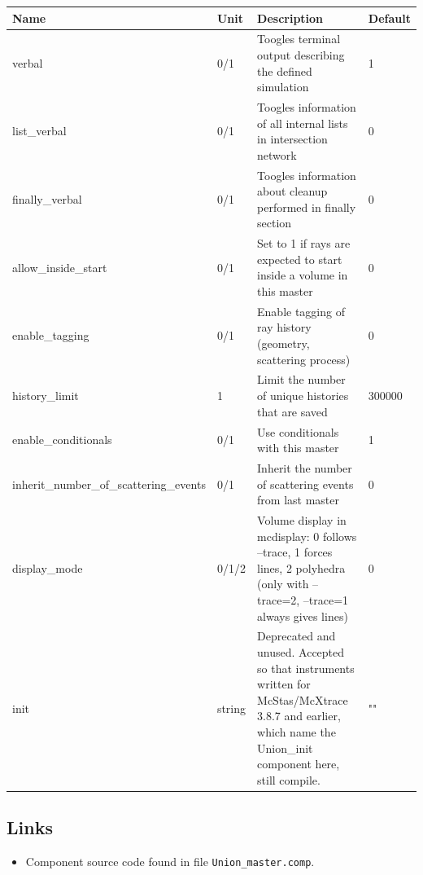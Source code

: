 \begin{longtable}{p{}p{}p{}p{}}
\toprule
\textbf{Name} & \textbf{Unit} & \textbf{Description} & \textbf{Default} \\
\midrule
\endhead
verbal & 0/1 & Toogles terminal output describing the defined simulation & 1 \\
list\_verbal & 0/1 & Toogles information of all internal lists in intersection network & 0 \\
finally\_verbal & 0/1 & Toogles information about cleanup performed in finally section & 0 \\
allow\_inside\_start & 0/1 & Set to 1 if rays are expected to start inside a volume in this master & 0 \\
enable\_tagging & 0/1 & Enable tagging of ray history (geometry, scattering process) & 0 \\
history\_limit & 1 & Limit the number of unique histories that are saved & 300000 \\
enable\_conditionals & 0/1 & Use conditionals with this master & 1 \\
inherit\_number\_of\_scattering\_events & 0/1 & Inherit the number of scattering events from last master & 0 \\
display\_mode & 0/1/2 & Volume display in mcdisplay: 0 follows --trace, 1 forces lines, 2 polyhedra (only with --trace=2, --trace=1 always gives lines) & 0 \\
init & string & Deprecated and unused. Accepted so that instruments written for McStas/McXtrace 3.8.7 and earlier, which name the Union\_init component here, still compile. & "" \\
\bottomrule
\end{longtable}

\subsection*{Links}
\begin{itemize}
  \item Component source code found in file \texttt{Union\_master.comp}.
\end{itemize}
